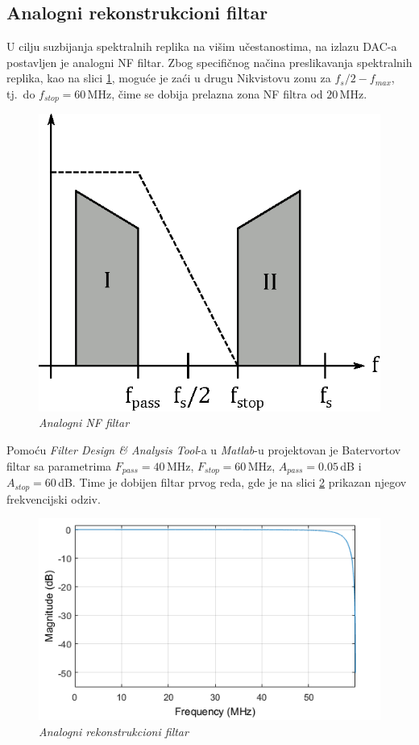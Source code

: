 \documentclass[conference]{IEEEtran}
\begin{document}
\subsection{Analogni rekonstrukcioni filtar}
U cilju suzbijanja spektralnih replika na višim učestanostima, na izlazu DAC-a postavljen je analogni NF filtar. Zbog specifičnog načina preslikavanja spektralnih replika, kao na slici \ref{slika:analogniNF}, moguće je zaći u drugu Nikvistovu zonu za $f_s/2-f_{max}$, tj.~do $f_{stop}=60$\,MHz, čime se dobija prelazna zona NF filtra od $20$\,MHz.
\vfill
\begin{figure}[h]
	\centering
	\includegraphics[scale=0.7]{./slike/nikvistAnalog.eps}
	\caption{\textsl{Analogni NF filtar}}
	\label{slika:analogniNF}
\end{figure}
\vfill
Pomoću \textsl{Filter Design \& Analysis Tool}-a u \textsl{Matlab}-u projektovan je Batervortov filtar sa parametrima $F_{pass}=40$\,MHz, $F_{stop}=60$\,MHz, $A_{pass}=0.05$\,dB i $A_{stop}=60$\,dB. Time je dobijen filtar prvog reda, gde je na slici \ref{slika:analogni} prikazan njegov frekvencijski odziv.
\newpage

\begin{figure}[h]
	\centering
	\includegraphics[scale=0.55]{./slike/analogni.png}
	\caption{\textsl{Analogni rekonstrukcioni filtar}}
	\label{slika:analogni}
\end{figure}
\end{document}
